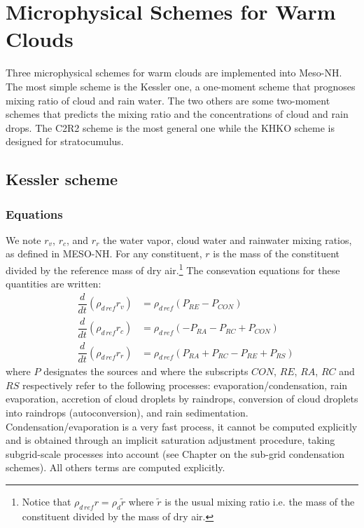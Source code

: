 
\chapter{Microphysical Schemes for Warm Clouds}
\minitoc
Three microphysical schemes for warm clouds are implemented into Meso-NH.
The most simple scheme is the Kessler one, a one-moment scheme that prognoses mixing ratio of cloud and rain water.
The two others are some two-moment schemes that predicts the mixing ratio and the concentrations of cloud and rain drops.
The C2R2 scheme is the most general one while the KHKO scheme is designed for stratocumulus.

\section{Kessler scheme}


\subsection{Equations}
We note $r_v$, $r_c$, and $r_r$ the water vapor, cloud water and rainwater
mixing ratios, as defined in MESO-NH. For any constituent,
$r$ is the mass of the
constituent divided by the reference mass of dry air.\footnote{Notice that
$\rho_{d\, ref}r = \rho_d \tilde r$ where  $\tilde r$ is the usual mixing ratio
i.e. the mass of the constituent divided by the mass of dry air.}
The consevation equations for these quantities are written:
\begin{eqnarray}
 &\dfrac{d}{dt}(  \rho_{d\,ref} r_v)&= \rho_{d\,ref} (P_{RE}-  P_{CON})\\
 &\dfrac{d}{dt}(  \rho_{d\,ref} r_c)&= \rho_{d\,ref}(- P_{RA} -  P_{RC}+  P_{CON})\\
 &\dfrac{d}{dt}(  \rho_{d\,ref} r_r)&= \rho_{d\,ref} (P_{RA} +  P_{RC} -  P_{RE}
+  P_{RS})
\end{eqnarray}
where $P$ designates the sources and where the subscripts
 $CON$, $RE$, $RA$, $RC$ and $RS$  respectively refer to the following processes:
evaporation/condensation, rain evaporation, accretion of cloud droplets by
raindrops, conversion of cloud droplets into raindrops (autoconversion),
and rain sedimentation.
Condensation/evaporation is a very fast process, it cannot be computed
explicitly and is obtained through an implicit saturation adjustment
procedure, taking subgrid-scale processes into account (see Chapter on the sub-grid condensation schemes).
All others terms are computed explicitly.


